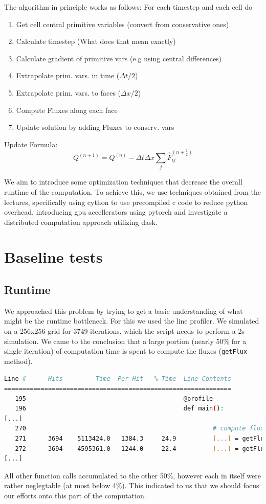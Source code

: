 \documentclass[a4paper,12pt]{article}
\begin{document}
The algorithm in principle works as follows:
For each timestep and each cell do
\begin{enumerate}
  \item Get cell central primitive variables (convert from conservative ones)
  \item Calculate timestep (What does that mean exactly)
  \item Calculate gradient of primitive vars (e.g using central differences)
  \item Extrapolate prim. vars. in time ($\Delta t / 2$)
  \item Extrapolate prim. vars. to faces ($\Delta x / 2$)
  \item Compute Fluxes along each face
  \item Update solution by adding Fluxes to conserv. vars
\end{enumerate}

Update Formula:
\begin{equation}
Q^{(n+1)} = Q^{(n)} - \Delta t \Delta x \sum_{j} \hat{F}_{ij}^{(n + \frac{1}{2})}
\end{equation}

We aim to introduce some optimization techniques that decrease the overall runtime of the computation.
To achieve this, we use techniques obtained from the lectures, specifically using cython to use precompiled c code to reduce python overhead,
introducing gpu accellerators using pytorch and investigate a distributed computation approach utilizing dask.

\section{Baseline tests}

\subsection{Runtime}
We approached this problem by trying to get a basic understanding of what might be the runtime bottleneck.
For this we used the line profiler.
We simulated on a 256x256 grid for 3749 iterations, which the script needs to perform a 2s simulation.
We came to the conclusion that a large portion (nearly 50\% for a single iteration) of computation time is spent to compute the fluxes (\verb|getFlux| method).
\begin{lstlisting}[language=bash,basicstyle=\scriptsize\ttfamily]
Line #      Hits         Time  Per Hit   % Time  Line Contents
==============================================================
   195                                           @profile
   196                                           def main():
[...]
   270                                                   # compute fluxes
   271      3694    5113424.0   1384.3     24.9          [...] = getFlux(...)
   272      3694    4595361.0   1244.0     22.4          [...] = getFlux(...)
[...]
\end{lstlisting}
All other function calls accumulated to the other 50\%, however each in itself were rather neglegtable (at most below 4\%).
This indicated to us that we should focus our efforts onto this part of the computation.
\end{document}
